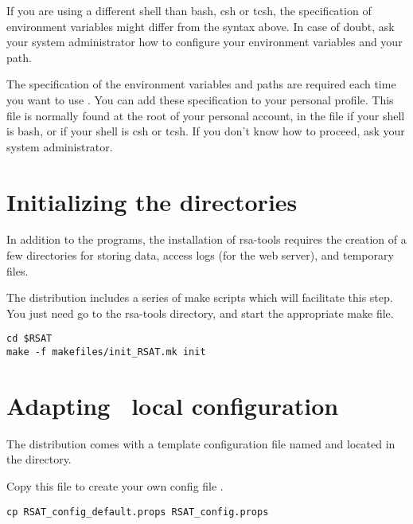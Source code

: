 \documentclass{book}
\begin{document}
If you are using a different shell than bash, csh or tcsh, the
specification of environment variables might differ from the syntax
above.  In case of doubt, ask your system administrator how to
configure your environment variables and your path.

The specification of the environment variables and paths are required
each time you want to use \RSAT. You can add these specification to
your personal profile.  This file is normally found at the root of
your personal account, in the file  if your shell is
bash, or  if your shell is csh or tcsh. If you don't know
how to proceed, ask your system administrator.



\section{Initializing the directories}

In addition to the programs, the installation of rsa-tools requires
the creation of a few directories for storing data, access logs (for
the web server), and temporary files.

The distribution includes a series of make scripts which will
facilitate this step. You just need go to the rsa-tools directory, and
start the appropriate make file.

\begin{footnotesize}
\begin{verbatim}
cd $RSAT
make -f makefiles/init_RSAT.mk init
\end{verbatim}
\end{footnotesize}



\section{Adapting \RSAT \  local configuration}

The \RSAT distribution comes with a template configuration file named
 and located in the 
directory.

Copy this file to create your own config file .

\begin{footnotesize}
\begin{verbatim}
cp RSAT_config_default.props RSAT_config.props
\end{verbatim}
\end{footnotesize}
\end{document}
